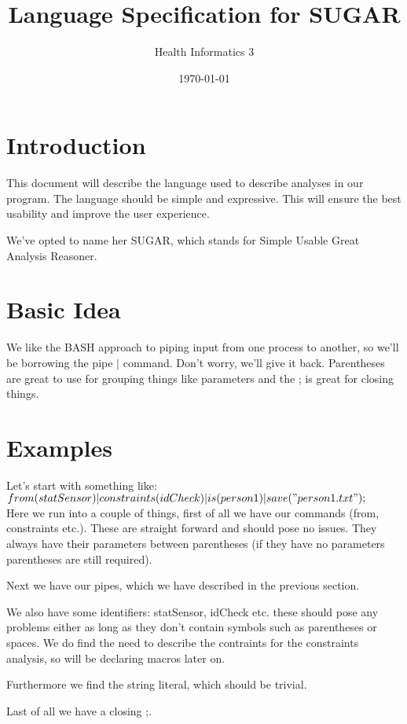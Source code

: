 \documentclass[a4paper]{article}
\title{Language Specification for SUGAR}
\author{Health Informatics 3}
\date{\today}
\begin{document}
\maketitle


\section{Introduction}
This document will describe the language used to describe analyses in our program. The language should be simple and expressive. This will ensure the best usability and improve the user experience. 

We've opted to name her SUGAR, which stands for Simple Usable Great Analysis Reasoner. 

\section{Basic Idea}
We like the BASH approach to piping input from one process to another, so we'll be borrowing the pipe $|$ command. Don't worry, we'll give it back. Parentheses are great to use for grouping things like parameters and the ; is great for closing things.

\section{Examples}
Let's start with something like:\\

$from(statSensor)|constraints(idCheck)|is(person1)|save("person1.txt");$\\

Here we run into a couple of things, first of all we have our commands (from, constraints etc.). These are straight forward and should pose no issues. They always have their parameters between parentheses (if they have no parameters parentheses are still required). 

Next we have our pipes, which we have described in the previous section. 

We also have some identifiers: statSensor, idCheck etc. these should pose any problems either as long as they don't contain symbols such as parentheses or spaces. We do find the need to describe the contraints for the constraints analysis, so will be declaring macros later on.

Furthermore we find the string literal, which should be trivial.

Last of all we have a closing ;.
\end{document}

